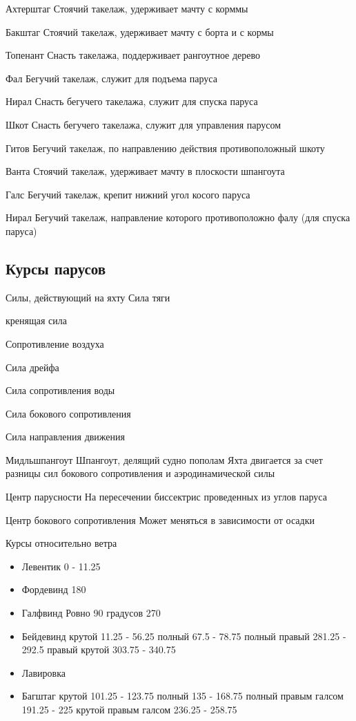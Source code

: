 \documentclass{article}        %
\begin{document}
Ахтерштаг
Стоячий такелаж, удерживает мачту с корммы

Бакштаг
Стоячий такелаж, удерживает мачту с борта и с кормы

Топенант
Снасть такелажа, поддерживает рангоутное дерево

Фал
Бегучий такелаж, служит для подъема паруса

Нирал
Снасть бегучего такелажа, служит для спуска паруса

Шкот
Снасть бегучего такелажа, служит для управления парусом

Гитов
Бегучий такелаж, по направлению действия противоположный шкоту

Ванта
Стоячий такелаж, удерживает мачту в плоскости шпангоута

Галс
Бегучий такелаж, крепит нижний угол косого паруса

Нирал
Бегучий такелаж, направление которого противоположно фалу (для спуска паруса)



\subsection{Курсы парусов}
Силы, действующий на яхту
Сила тяги

кренящая сила

Сопротивление воздуха

Сила дрейфа

Сила сопротивления воды

Сила бокового сопротивления

Сила направления движения


Мидльшпангоут
Шпангоут, делящий судно пополам
Яхта двигается за счет разницы сил бокового сопротивления и аэродинамической силы


Центр парусности
На пересечении биссектрис проведенных из углов паруса

Центр бокового сопротивления
Может меняться в зависимости от осадки	

Курсы относительно ветра

\begin{itemize}
\item Левентик
	0 - 11.25 
\item Фордевинд
	180 
\item Галфвинд
	Ровно 90 градусов
	270
\item Бейдевинд
	крутой 11.25 - 56.25
	полный 67.5 - 78.75
	полный правый 281.25 - 292.5
	правый крутой 303.75 - 340.75
\item Лавировка
\item Багштаг
	крутой 101.25 - 123.75
	полный 135 - 168.75
	полный правым галсом 191.25 - 225
	крутой правым галсом 236.25 - 258.75
\end{itemize}
\end{document}
